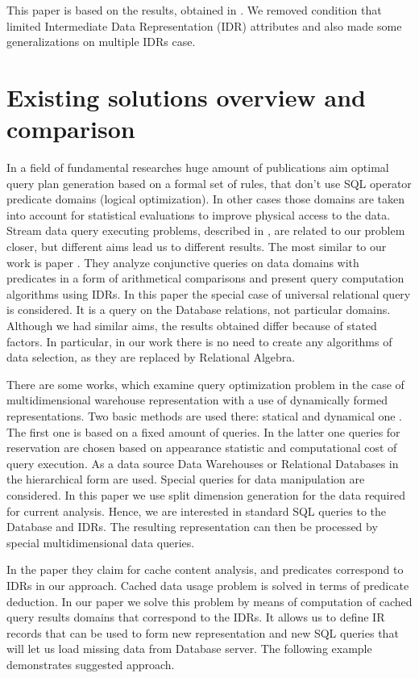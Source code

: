 \documentclass[10pt,a4paper]{article}
\begin{document}
This paper is based on the results, obtained in \cite{zyk_pol}. We removed
condition that limited Intermediate Data Representation (IDR) attributes and
also made some generalizations on multiple IDRs case.

\section{Existing solutions overview and comparison}

In a field of fundamental researches huge amount of publications aim optimal
query plan generation based on a formal set of rules, that don't use SQL
operator predicate domains (logical optimization). In other cases those domains
are taken into account for statistical evaluations to improve physical access to
the data. Stream data query executing problems, described in \cite{Olston03,
Denny05}, are related to our problem closer, but different aims lead us to
different results. The most similar to our work is paper \cite{Afrati06}. They
analyze conjunctive queries on data domains with predicates in a form of
arithmetical comparisons and present query computation algorithms using IDRs. In
this paper the special case of universal relational query is considered. It is a
query on the Database relations, not particular domains. Although we had similar
aims, the results obtained differ because of stated factors. In particular, in
our work there is no need to create any algorithms of data selection, as they
are replaced by Relational Algebra.

There are some works, which examine query optimization problem in the case of
multidimensional warehouse representation with a use of dynamically formed
representations. Two basic methods are used there: statical \cite{baralis,
gupta, gupta-mumick} and dynamical one \cite{scheuermann, shim, kalnis, chang}.
The first one is based on a fixed amount of queries. In the latter one queries
for reservation are chosen based on appearance statistic and computational cost
of query execution. As a data source Data Warehouses or Relational Databases in
the hierarchical form are used. Special queries for data manipulation are
considered. In this paper we use split dimension generation for the data
required for current analysis. Hence, we are interested in standard SQL queries
to the Database and IDRs. The resulting representation can then be processed by
special multidimensional data queries.

In the \cite{Keller96} paper they claim for cache content analysis, and
predicates correspond to IDRs in our approach. Cached data usage problem is solved
in terms of predicate deduction. In our paper we solve this problem by means of
computation of cached query results domains that correspond to the IDRs. It allows
us to define IR records that can be used to form new representation and new SQL
queries that will let us load missing data from Database server. The following
example demonstrates suggested approach.
\end{document}
